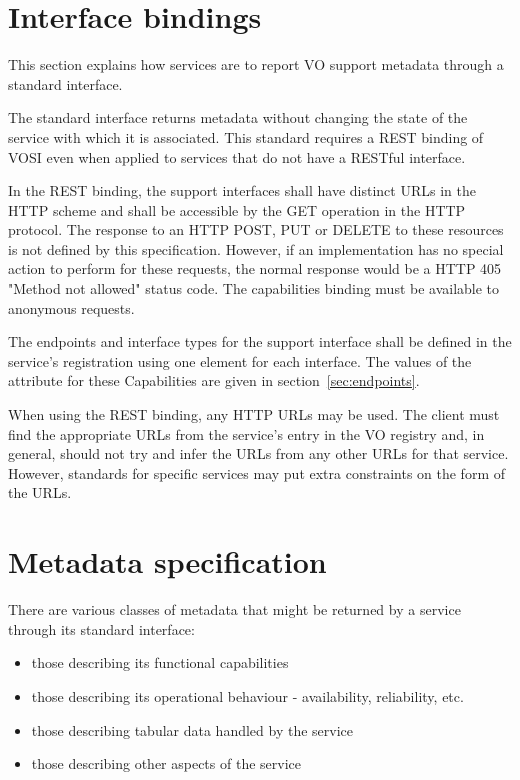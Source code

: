 \documentclass[11pt,letter]{ivoa}
\begin{document}
\section{Interface bindings}
\label{sec:bindings}

This section explains how services are to report VO support metadata
through a standard interface.

The standard interface returns metadata without changing the state of
the service with which it is associated. This standard requires a REST
binding of VOSI even when applied to services that do not have a RESTful
interface.

In the REST binding, the support interfaces shall have distinct URLs in
the HTTP scheme and shall be accessible by the GET operation in the HTTP
protocol. The response to an HTTP POST, PUT or DELETE to these resources
is not defined by this specification. However, if an implementation has
no special action to perform for these requests, the normal response
would be a HTTP 405 "Method not allowed" status code.  The
capabilities binding must be available to anonymous
requests.

The endpoints and interface types for the support interface shall be
defined in the service's registration using one 
element for each interface. The values of the 
attribute for these Capabilities are given in
section~\ref{sec:endpoints}.

When using the REST binding, any HTTP URLs may be used. The client must
find the appropriate URLs from the service's entry in the VO registry
and, in general, should not try and infer the URLs from any other URLs
for that service. However, standards for specific services may put extra
constraints on the form of the URLs.

\section{Metadata specification}
\label{sec:metadata}

 There are various classes of metadata that might be returned by a
 service through its standard interface:

\begin{itemize}
\item those describing its functional capabilities
\item those describing its operational behaviour - availability, reliability, etc.
\item those describing tabular data handled by the service
\item those describing other aspects of the service 
\end{itemize}
\end{document}
